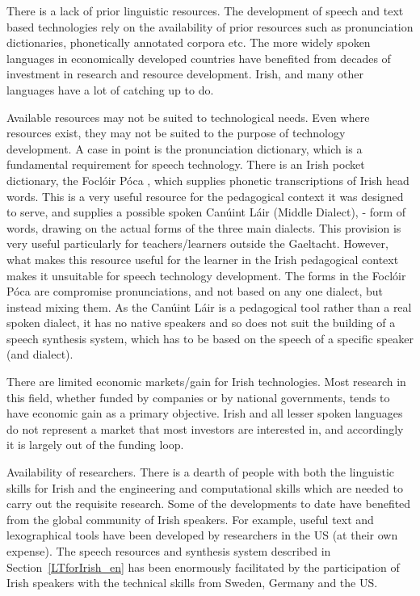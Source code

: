\begin{multicols}{2}
There is a lack of prior linguistic resources. The development of speech and text based technologies rely on the availability of prior resources such as pronunciation dictionaries, phonetically annotated corpora etc. The more widely spoken languages in economically developed countries have benefited from decades of investment in research and resource development. Irish, and many other languages have a lot of catching up to do.

Available resources may not be suited to technological needs. Even where resources exist, they may not be suited to the purpose of technology development. A case in point is the pronunciation dictionary, which is a fundamental requirement for speech technology. There is an Irish pocket dictionary, the Foclóir Póca \cite{focloir}, which supplies phonetic transcriptions of Irish head words. This is a very useful resource for the pedagogical context it was designed to serve, and supplies a possible spoken Canúint Láir (Middle Dialect), - form of words, drawing on the actual forms of the three main dialects. This provision is very useful particularly for teachers/learners outside the Gaeltacht. However, what makes this resource useful for the learner in the Irish pedagogical context makes it unsuitable for speech technology development. The forms in the Foclóir Póca are compromise pronunciations, and not based on any one dialect, but instead mixing them. As the Canúint Láir is a pedagogical tool rather than a real spoken dialect, it has no native speakers and so does not suit the building of a speech synthesis system, which has to be based on the speech of a specific speaker (and dialect).

There are limited economic markets/gain for Irish technologies. Most research in this field, whether funded by companies or by national governments, tends to have economic gain as a primary objective.  Irish and all lesser spoken languages do not represent a market that most investors are interested in, and accordingly it is largely out of the funding loop.

Availability of researchers. There is a dearth of people with both the linguistic skills for Irish and the engineering and computational skills which are needed to carry out the requisite research.  Some of the developments to date have benefited from the global community of Irish speakers. For example, useful text and lexographical tools have been developed by researchers in the US (at their own expense). The speech resources and synthesis system described in Section~\ref{LTforIrish_en} has been enormously facilitated by the participation of Irish speakers with the technical skills from Sweden, Germany and the US.


\end{multicols}

